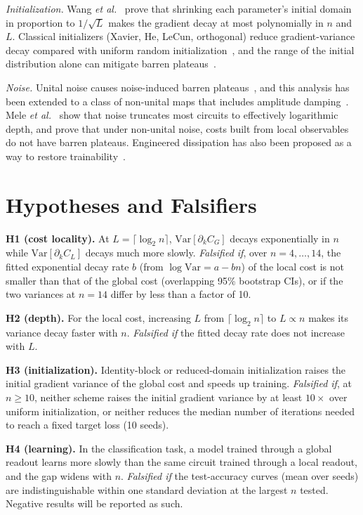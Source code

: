 \documentclass[conference]{IEEEtran}
\begin{document}
\emph{Initialization.} Wang \emph{et al.}~\cite{wangqi2024} prove that shrinking
each parameter's initial domain in proportion to $1/\sqrt{L}$ makes the
gradient decay at most polynomially in $n$ and $L$. Classical initializers
(Xavier, He, LeCun, orthogonal) reduce gradient-variance decay compared with
uniform random initialization~\cite{kashif2024date}, and the range of the
initial distribution alone can mitigate barren plateaus~\cite{kashif2024icrc}.

\emph{Noise.} Unital noise causes noise-induced barren
plateaus~\cite{wang2021}, and this analysis has been extended to a class of
non-unital maps that includes amplitude damping~\cite{singkanipa2025}.
Mele \emph{et al.}~\cite{mele2026} show that noise truncates most circuits to
effectively logarithmic depth, and prove that under non-unital noise, costs
built from local observables do not have barren plateaus. Engineered
dissipation has also been proposed as a way to restore
trainability~\cite{sannia2024}.

\section{Hypotheses and Falsifiers}
\textbf{H1 (cost locality).} At $L=\lceil\log_2 n\rceil$, $\mathrm{Var}[\partial_k C_G]$
decays exponentially in $n$ while $\mathrm{Var}[\partial_k C_L]$ decays much more slowly.
\emph{Falsified if}, over $n=4,\dots,14$, the fitted exponential decay rate
$b$ (from $\log\mathrm{Var}=a-bn$) of the local cost is not smaller than that of
the global cost (overlapping 95\% bootstrap CIs), or if the two variances at
$n=14$ differ by less than a factor of 10.

\textbf{H2 (depth).} For the local cost, increasing $L$ from $\lceil\log_2 n\rceil$
to $L\propto n$ makes its variance decay faster with $n$.
\emph{Falsified if} the fitted decay rate does not increase with $L$.

\textbf{H3 (initialization).} Identity-block or reduced-domain initialization raises
the initial gradient variance of the global cost and speeds up training.
\emph{Falsified if}, at $n\ge 10$, neither scheme raises the initial gradient
variance by at least $10\times$ over uniform initialization, or neither reduces
the median number of iterations needed to reach a fixed target loss (10 seeds).

\textbf{H4 (learning).} In the classification task, a model trained through a
global readout learns more slowly than the same circuit trained through a
local readout, and the gap widens with $n$.
\emph{Falsified if} the test-accuracy curves (mean over seeds) are
indistinguishable within one standard deviation at the largest $n$ tested.
Negative results will be reported as such.
\end{document}
